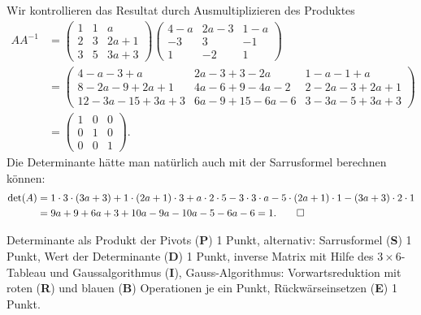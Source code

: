 \begin{loesung}
Wir kontrollieren das Resultat durch Ausmultiplizieren des Produktes
\begin{align*}
AA^{-1}
&=
\begin{pmatrix}
1&1& a  \\
2&3&2a+1\\
3&5&3a+3
\end{pmatrix}
\begin{pmatrix}
 4-a&2a-3& 1-a\\
-3  &   3&-1  \\
 1  &  -2& 1
\end{pmatrix}
\\
&=
\begin{pmatrix}
4-a-3+a       & 2a-3+3-2a    & 1-a-1+a     \\
8-2a-9+2a+1   & 4a-6+9-4a-2  & 2-2a-3+2a+1 \\
12-3a-15+3a+3 & 6a-9+15-6a-6 & 3-3a-5+3a+3
\end{pmatrix}
\\
&=
\begin{pmatrix}
1&0&0\\
0&1&0\\
0&0&1
\end{pmatrix}.
\end{align*}
Die Determinante hätte man natürlich auch mit der Sarrusformel berechnen
können:
\begin{align*}
\det(A)
&=
1\cdot 3\cdot (3a+3)
+
1\cdot (2a+1)\cdot 3
+
a\cdot2\cdot 5
-
3\cdot 3\cdot a
-
5\cdot (2a+1)\cdot 1
-
(3a+3)\cdot 2\cdot 1
\\
&=
9a+9 + 6a+3 + 10a -9a - 10a-5 -6a-6=1.
\qedhere
\end{align*}
\end{loesung}

\begin{bewertung}
Determinante als Produkt der Pivots ({\bf P}) 1 Punkt,
alternativ: Sarrusformel ({\bf S}) 1 Punkt,
Wert der Determinante ({\bf D}) 1 Punkt,
inverse Matrix mit Hilfe des $3\times 6$-Tableau und Gaussalgorithmus
({\bf I}),
Gauss-Algorithmus: Vorwartsreduktion mit roten ({\bf R}) und blauen ({\bf B})
Operationen je ein Punkt,
Rückwärseinsetzen ({\bf E}) 1 Punkt.
\end{bewertung}


